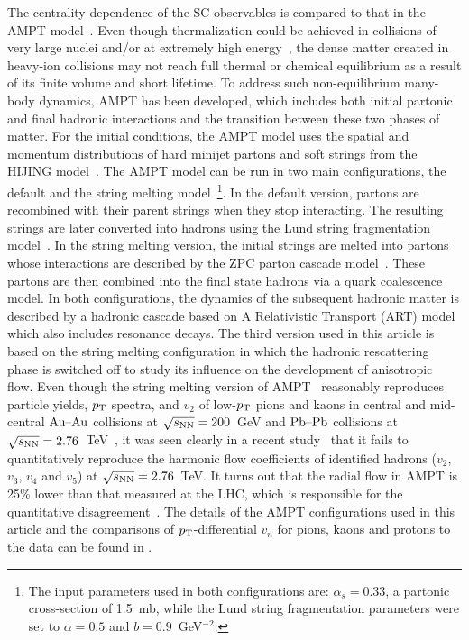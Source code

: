 The centrality dependence of the SC observables is compared to that in the {AMPT} model~\cite{Zhang:1999bd,Lin:2000cx,Lin:2004en}.
Even though thermalization could be achieved in collisions of very large nuclei and/or at extremely high energy~\cite{Kurkela:2015qoa}, the dense matter created in heavy-ion collisions may not reach full thermal or chemical equilibrium as a result of its finite volume and short lifetime. To address such non-equilibrium many-body dynamics, AMPT has been developed, which includes both initial partonic and final hadronic interactions and the transition between these two phases of matter.
For the initial conditions, the AMPT model uses the spatial and momentum distributions of hard minijet partons and soft strings from the HIJING model~\cite{Wang:1991hta,Gyulassy:1994ew}.
The AMPT model can be run in two main configurations, the default and the string melting model~\footnote{The input parameters used in both configurations are: $\alpha_s = 0.33$, a partonic cross-section of 1.5~mb, while the Lund string fragmentation parameters were set to $\alpha = 0.5$ and $b = 0.9$~GeV$^{-2}$.}.
In the default version, partons are recombined with their parent strings when they stop interacting. The resulting strings are later converted into hadrons using the Lund string fragmentation model~\cite{Andersson:1986gw,NilssonAlmqvist:1986rx}. In the string melting version, the initial strings are melted into partons whose interactions are described by the ZPC parton cascade model~\cite{Zhang:1997ej}. These partons are then combined into the final state hadrons via a quark coalescence model. 
In both configurations, the dynamics of the subsequent hadronic matter is described by a hadronic cascade based on A Relativistic Transport (ART) model~\cite{Li:2001xh} which also includes resonance decays.
The third version used in this article is based on the string melting configuration in which the hadronic rescattering phase is switched off to study its influence on the development of anisotropic flow. 
Even though the string melting version of AMPT~\cite{Lin:2001zk,Lin:2004en} reasonably reproduces particle yields, $p_{\rm T}$ spectra, and $v_2$ of low-$p_{\rm T}$ pions and kaons in central and mid-central $\textnormal{Au--Au}$ collisions at $\sqrt{s_{\textnormal{NN}}}=200$~GeV and $\textnormal{Pb--Pb}$ collisions at $\sqrt{s_{\textnormal{NN}}}=2.76$~TeV~\cite{Lin:2014tya}, it was seen clearly in a recent study~\cite{Adam:2016nfo} that it fails to quantitatively reproduce the harmonic flow coefficients of identified hadrons ($v_2$, $v_3$, $v_4$ and $v_5$) at $\sqrt{s_{\textnormal{NN}}}=2.76$~TeV. It turns out that the radial flow in AMPT is 25\% lower than that measured at the LHC, which is responsible for the quantitative disagreement~\cite{Adam:2016nfo}. The details of the AMPT configurations used in this article and the comparisons of $p_{\rm T}$-differential $v_{n}$ for pions, kaons and protons to the data can be found in \cite{Adam:2016nfo}.

